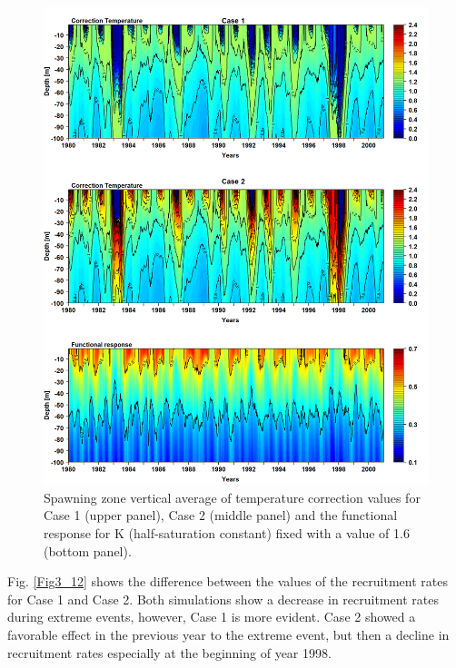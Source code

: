 \begin{figure}[ht]
	\includegraphics[width=1.0\textwidth]{figures/Fig3_11.png}
	\centering
	\caption{Spawning zone vertical average of temperature correction values for Case 1 (upper panel), Case 2 (middle panel) and the functional response for K (half-saturation constant) fixed with a value of 1.6 (bottom panel).}
	\label{Fig3_11}
\end{figure}

Fig. \ref{Fig3_12} shows the difference between the values of the recruitment rates for Case 1 and Case 2. Both simulations show a decrease in recruitment rates during extreme events, however, Case 1 is more evident. Case 2 showed a favorable effect in the previous year to the extreme event, but then a decline in recruitment rates especially at the beginning of year 1998.\\

